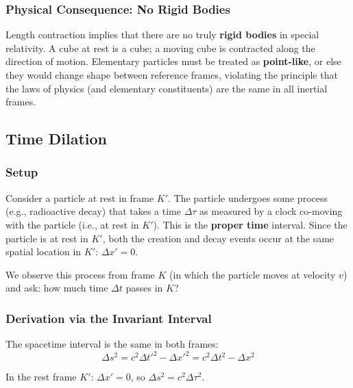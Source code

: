 \subsubsection*{Physical Consequence: No Rigid Bodies}

Length contraction implies that there are no truly \textbf{rigid bodies} in special relativity. A cube at rest is a cube; a moving cube is contracted along the direction of motion. Elementary particles must be treated as \textbf{point-like}, or else they would change shape between reference frames, violating the principle that the laws of physics (and elementary constituents) are the same in all inertial frames.

\subsection{Time Dilation}

\subsubsection*{Setup}

Consider a particle at rest in frame $K'$. The particle undergoes some process (e.g., radioactive decay) that takes a time $\Delta\tau$ as measured by a clock co-moving with the particle (i.e., at rest in $K'$). This is the \textbf{proper time} interval. Since the particle is at rest in $K'$, both the creation and decay events occur at the same spatial location in $K'$: $\Delta x' = 0$.

We observe this process from frame $K$ (in which the particle moves at velocity $v$) and ask: how much time $\Delta t$ passes in $K$?

\subsubsection*{Derivation via the Invariant Interval}

The spacetime interval is the same in both frames:
\begin{equation}\label{eq:lec05:interval-process}
    \Delta s^2 = c^2 \Delta t'^2 - \Delta x'^2 = c^2 \Delta t^2 - \Delta x^2
\end{equation}

In the rest frame $K'$: $\Delta x' = 0$, so $\Delta s^2 = c^2 \Delta\tau^2$.

